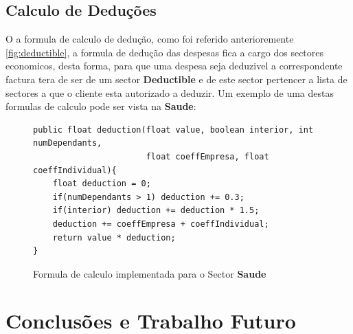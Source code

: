 \documentclass[12pt,a4paper]{report}
\begin{document}
\section{Calculo de Deduções}
    O a formula de calculo de dedução, como foi referido anterioremente
    \ref{fig:deductible}, a formula de dedução das despesas fica a cargo dos
    sectores economicos, desta forma, para que uma despesa seja deduzivel
    a correspondente factura tera de ser de um sector \textbf{Deductible}
    e de este sector pertencer a lista de sectores a que o cliente esta
    autorizado a deduzir. Um exemplo de uma destas formulas de calculo pode
    ser vista na \textbf{Saude}:
    \begin{figure}[h]
        \begin{verbatim}
public float deduction(float value, boolean interior, int numDependants,
                       float coeffEmpresa, float coeffIndividual){
    float deduction = 0;
    if(numDependants > 1) deduction += 0.3;
    if(interior) deduction += deduction * 1.5;
    deduction += coeffEmpresa + coeffIndividual;
    return value * deduction;
}
        \end{verbatim}
        \caption{Formula de calculo implementada para o Sector \textbf{Saude}}
        \label{fig:formulaDeduct}
    \end{figure}


\chapter{Conclusões e Trabalho Futuro}
\end{document}
